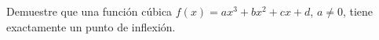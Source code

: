 \item Demuestre que una función cúbica $f(x) = ax^3 + bx^2 + cx + d$, $a \ne 0$, tiene exactamente un punto de inflexión.
